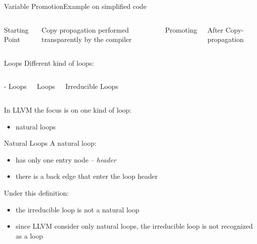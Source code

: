 \begin{frame}{Variable Promotion}{Example on simplified code}
\begin{columns}[t]
\begin{block}{Starting Point}
\centering
{}
\end{block}

Copy propagation performed transparently by the compiler

\begin{block}{Promoting }
\centering
{}
\end{block}

\begin{block}{After Copy-propagation}
\centering
{}
\end{block}

\end{columns}
\end{frame}

\begin{frame}{Loops}
Different kind of loops:

\begin{columns}[t]
\begin{block}{- Loops}
\centering

\end{block}

\begin{block}{ Loops}
\centering

\end{block}

\begin{block}{Irreducible Loops}
\centering

\end{block}
\end{columns}

\bigskip
In LLVM the focus is on one kind of loop:

\begin{itemize}
\item natural loops
\end{itemize}
\end{frame}

\begin{frame}{Natural Loops}
A natural loop:

\begin{itemize}
\item has only one entry node -- \emph{header}
\item there is a back edge that enter the loop header
\end{itemize}

\vfill
Under this definition:

\begin{itemize}
\item the irreducible loop is not a natural loop
\item since LLVM consider only natural loops, the irreducible loop \alert{is not
      recognized} as a loop
\end{itemize}
\end{frame}

